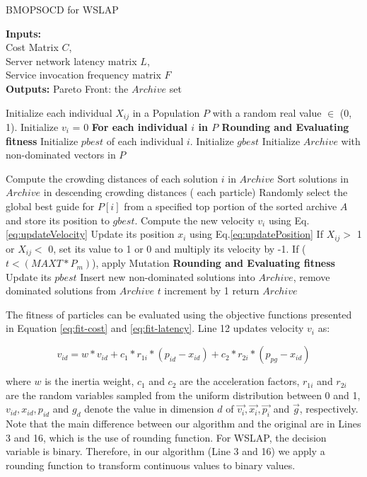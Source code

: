 \documentclass[10pt,journal,compsoc]{IEEEtran}
\begin{document}
\begin{algorithm}[!htb]
 \caption{BMOPSOCD for WSLAP}
 \footnotesize
 \textbf{Inputs:} \\
  Cost Matrix $C$, \\
  Server network latency matrix $L$, \\
  Service invocation frequency matrix $F$ \\
 \textbf{Outputs:}
  Pareto Front: the $Archive$ set

 \begin{algorithmic}[1]
  \State Initialize each individual $X_{ij}$ in a Population $P$ with a random real value $\in$ (0, 1).
  \State Initialize $v_i$ = 0
  \State \textbf{For each individual $i$ in $P$ Rounding and Evaluating fitness}
  \State Initialize $pbest$ of each individual $i$.
  \State Initialize $gbest$
  \State Initialize $Archive$ with non-dominated vectors in $P$

  \Repeat
   \State Compute the crowding distances of each solution $i$ in $Archive$
   \State Sort solutions in $Archive$ in descending crowding distances
   \For ( each particle)
    \State Randomly select the global best guide for $P[i]$ from a specified top portion of the sorted archive $A$ and store its position to $gbest$.
    \State Compute the new velocity $v_i$ using Eq.\ref{eq:updateVelocity}
    \State Update its position $x_i$ using Eq.\ref{eq:updatePosition}
    \State If $X_{ij} >$ 1 or $X_{ij} <$ 0, set its value to 1 or 0 and multiply its velocity by -1.
    \State If ($t < (MAXT * P_m)$), apply Mutation
    \State \textbf{Rounding and Evaluating fitness}
    \State Update its $pbest$
    \EndFor
  \State Insert new non-dominated solutions into $Archive$, remove dominated solutions from $Archive$
  \State $t$ increment by 1
  \State return $Archive$
 \end{algorithmic}
 \label{alg:BMOPSOCD}
\end{algorithm}

The fitness of particles can be evaluated using the objective functions presented in Equation  \ref{eq:fit-cost} and \ref{eq:fit-latency}. Line 12 updates velocity $v_i$ as:
\begin{small}
\begin{equation}
 v_{id} = w * v_{id} + c_1 * r_{1i} * (p_{id} - x_{id}) + c_2 * r_{2i} * (p_{pg} - x_{id})
\end{equation}
\end{small}
\noindent where $w$ is the inertia weight, $c_1$ and $c_2$ are the acceleration factors, $r_{1i}$ and $r_{2i}$ are the random variables sampled from the uniform distribution between 0 and 1, $v_{id}, x_{id}, p_{id}$ and $g_{d}$ denote the value in dimension $d$ of $\vec{v_i}, \vec{x_i},\vec{p_i}$ and $\vec{g}$, respectively.  Note that the main difference between our algorithm and the original \cite{Raquel} are in Lines 3 and 16, which is the use of rounding function. For WSLAP, the decision variable is binary. Therefore, in our algorithm (Line 3 and 16) we apply a rounding function to transform continuous values to binary values.
\end{document}
